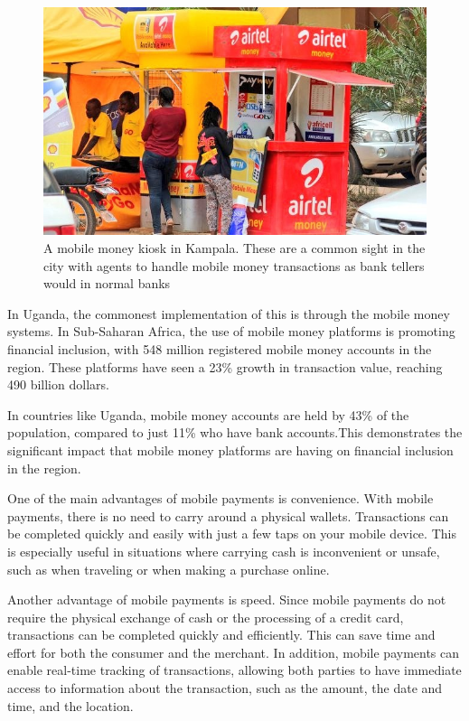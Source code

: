  \begin{figure}
    \begin{center}
        \includegraphics[scale = 0.5]{images/mobile-money}
        \caption{A mobile money kiosk in Kampala. These are a common sight in the city with agents to handle mobile money transactions as bank tellers would in normal banks}
    \end{center}
\end{figure}
In Uganda, the commonest implementation of this is through the mobile money systems\cite{centellegher_mobile_2018}.
In Sub-Saharan Africa, the use of mobile money platforms is promoting financial inclusion, with 548 million registered mobile money accounts in the region. These platforms have seen a 23\% growth in transaction value, reaching 490 billion dollars.

In countries like Uganda, mobile money accounts are held by 43\% of the population, compared to just 11\% who have bank accounts.This demonstrates the significant impact that mobile money platforms are having on financial inclusion in the region\cite{baah_state_2021}.

One of the main advantages of mobile payments is convenience. With mobile payments, there is no need to carry around a physical wallets. Transactions can be completed quickly and easily with just a few taps on your mobile device. This is especially useful in situations where carrying cash is inconvenient or unsafe, such as when traveling or when making a purchase online.

Another advantage of mobile payments is speed. Since mobile payments do not require the physical exchange of cash or the processing of a credit card, transactions can be completed quickly and efficiently. This can save time and effort for both the consumer and the merchant. In addition, mobile payments can enable real-time tracking of transactions, allowing both parties to have immediate access to information about the transaction, such as the amount, the date and time, and the location.

